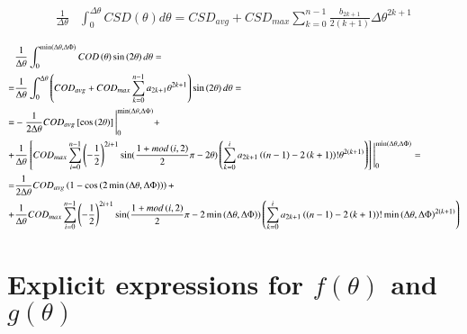 \documentclass[review]{elsarticle}
\begin{document}
\begin{equation}
\begin{aligned}
\frac{1}{\Delta\theta}&\int_{0}^{\Delta\theta}CSD\left(\theta\right)d\theta=CSD_{avg}+CSD_{max}\sum_{k=0}^{n-1}\frac{b_{2k+1}}{2\left(k+1\right)}\Delta\theta^{2k+1}
\end{aligned}
\end{equation}

\begin{equation}
\footnotesize
\begin{aligned}
&\frac{1}{\Delta\theta}\int_{0}^{\min\left(\Delta\theta,\Delta\Phi\right)}COD\left(\theta\right)\sin\left(2\theta\right)d\theta=\\
=&\frac{1}{\Delta\theta}\int_{0}^{\Delta\theta}\left(COD_{avg}+COD_{max}\sum_{k=0}^{n-1}a_{2k+1}\theta^{2k+1}\right)\sin\left(2\theta\right)d\theta=\\
=&-\frac{1}{2\Delta\theta}COD_{avg}\left[\cos\left(2\theta\right)\right]\Bigg\rvert_{0}^{\min\left(\Delta\theta,\Delta\Phi\right)}+\\
+&\frac{1}{\Delta\theta}\left[COD_{max}\sum_{i=0}^{n-1}\left(-\frac{1}{2}\right)^{2i+1}\sin(\frac{1+mod\left(i,2\right)}{2}\pi-2\theta)\left(\sum_{k=0}^{i}a_{2k+1}\left(\left(n-1\right)-2\left(k+1\right)\right)!\theta^{2\left(k+1\right)}\right)\right]\Bigg\rvert_{0}^{\min\left(\Delta\theta,\Delta\Phi\right)}=\\
=&\frac{1}{2\Delta\theta}COD_{avg}\left(1-\cos\left(2\min\left(\Delta\theta,\Delta\Phi\right)\right)\right)+\\
+&\frac{1}{\Delta\theta}COD_{max}\sum_{i=0}^{n-1}\left(-\frac{1}{2}\right)^{2i+1}\sin(\frac{1+mod\left(i,2\right)}{2}\pi-2\min\left(\Delta\theta,\Delta\Phi\right))\left(\sum_{k=0}^{i}a_{2k+1}\left(\left(n-1\right)-2\left(k+1\right)\right)!\min\left(\Delta\theta,\Delta\Phi\right)^{2\left(k+1\right)}\right)
\end{aligned}
\end{equation}



\appendix
\section{Explicit expressions for $f\left(\theta\right)$ and $g\left(\theta\right)$}\label{app:fandgexplicit}
\end{document}
